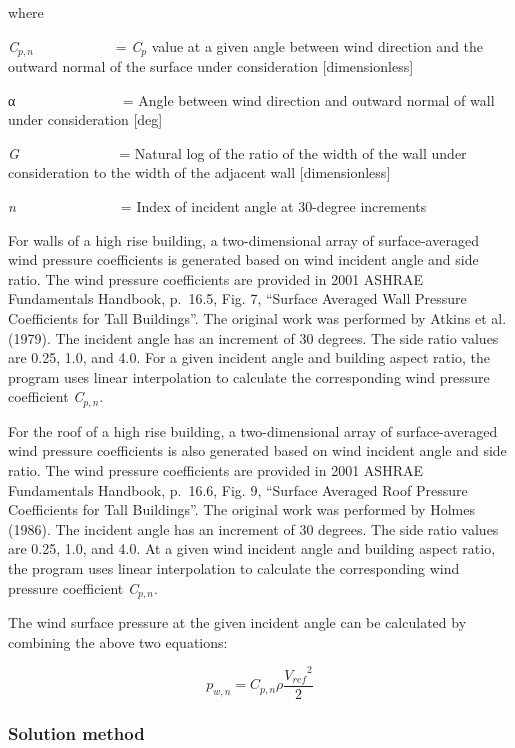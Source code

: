 where

\emph{C\(_{p,n}\)}~~~~~~~~~~~ = \emph{C\(_{p}\)} value at a given angle between wind direction and the outward normal of the surface under consideration {[}dimensionless{]}

α~~~ ~~~~~~~~~~~ = Angle between wind direction and outward normal of wall under consideration {[}deg{]}

\emph{G}~~ ~~~~~~~~~~~ = Natural log of the ratio of the width of the wall under consideration to the width of the adjacent wall {[}dimensionless{]}

\emph{n} ~~ ~~~~~~~~~~~ = Index of incident angle at 30-degree increments

For walls of a high rise building, a two-dimensional array of surface-averaged wind pressure coefficients is generated based on wind incident angle and side ratio. The wind pressure coefficients are provided in 2001 ASHRAE Fundamentals Handbook, p.~16.5, Fig. 7, ``Surface Averaged Wall Pressure Coefficients for Tall Buildings''. The original work was performed by Atkins et al. (1979). The incident angle has an increment of 30 degrees. The side ratio values are 0.25, 1.0, and 4.0. For a given incident angle and building aspect ratio, the program uses linear interpolation to calculate the corresponding wind pressure coefficient \emph{C\(_{p,n}\)}.

For the roof of a high rise building, a two-dimensional array of surface-averaged wind pressure coefficients is also generated based on wind incident angle and side ratio. The wind pressure coefficients are provided in 2001 ASHRAE Fundamentals Handbook, p.~16.6, Fig. 9, ``Surface Averaged Roof Pressure Coefficients for Tall Buildings''. The original work was performed by Holmes (1986). The incident angle has an increment of 30 degrees. The side ratio values are 0.25, 1.0, and 4.0. At a given wind incident angle and building aspect ratio, the program uses linear interpolation to calculate the corresponding wind pressure coefficient \emph{C\(_{p,n}\)}.

The wind surface pressure at the given incident angle can be calculated by combining the above two equations:

\begin{equation}
{p_{w,n}} = {C_{p,n}}\rho \frac{{{V_{ref}}^2}}{2}
\end{equation}

\subsubsection{Solution method}\label{solution-method}

